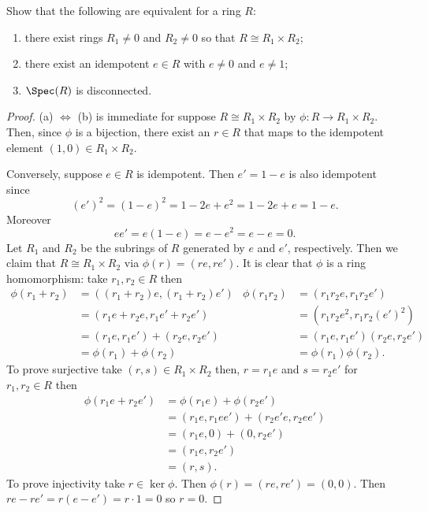 \newpage
\begin{problem}
Show that the following are equivalent for a ring $R$:
\begin{enumerate}[noitemsep,label=(\alph*)]
\item there exist rings $R_1\neq 0$ and $R_2\neq 0$ so that
  $R\cong R_1\times R_2$;
\item there exist an idempotent $e\in R$ with $e\neq 0$ and
  $e\neq 1$;
\item $\Spec(R)$ is disconnected.
\end{enumerate}
\end{problem}
\begin{proof}
(a) $\iff$ (b) is immediate for suppose $R\cong R_1\times
R_2$ by $\phi\colon R\to R_1\times R_2$. Then, since $\phi$ is a
bijection, there exist an $r\in R$ that maps to the idempotent
element $(1,0)\in R_1\times R_2$.

Conversely, suppose $e\in R$ is idempotent. Then $e'=1-e$ is also
idempotent since
\[
(e')^2=(1-e)^2=1-2e+e^2=1-2e+e=1-e.
\]
Moreover
\[
ee'=e(1-e)=e-e^2=e-e=0.
\]
Let $R_1$ and $R_2$ be the subrings of $R$ generated by $e$ and
$e'$, respectively. Then we claim that $R\cong R_1\times R_2$ via
$\phi(r)=(re,re')$. It is clear that $\phi$ is a ring
homomorphism: take $r_1,r_2\in R$ then
\begin{align*}
\phi(r_1+r_2)&=((r_1+r_2)e,(r_1+r_2)e')&
\phi(r_1r_2)&=(r_1r_2e,r_1r_2e')\\
&=(r_1e+r_2e,r_1e'+r_2e')&
&=\left(r_1r_2e^2,r_1r_2(e')^2\right)\\
&=(r_1e,r_1e')+(r_2e,r_2e')&
&=(r_1e,r_1e')(r_2e,r_2e')\\
&=\phi(r_1)+\phi(r_2)&
&=\phi(r_1)\phi(r_2).
\end{align*}
To prove surjective take $(r,s)\in R_1\times
R_2$ then, $r=r_1e$ and $s=r_2e'$ for $r_1,r_2\in R$ then
\begin{align*}
\phi(r_1e+r_2e')&=\phi(r_1e)+\phi(r_2e')\\
&=(r_1e,r_1ee')+(r_2e'e,r_2ee')\\
&=(r_1e,0)+(0,r_2e')\\
&=(r_1e,r_2e')\\
&=(r,s).
\end{align*}
To prove injectivity take $r\in\ker\phi$. Then
$\phi(r)=(re,re')=(0,0)$. Then $re-re'=r(e-e')=r\cdot 1=0$ so
$r=0$.


\end{proof}
